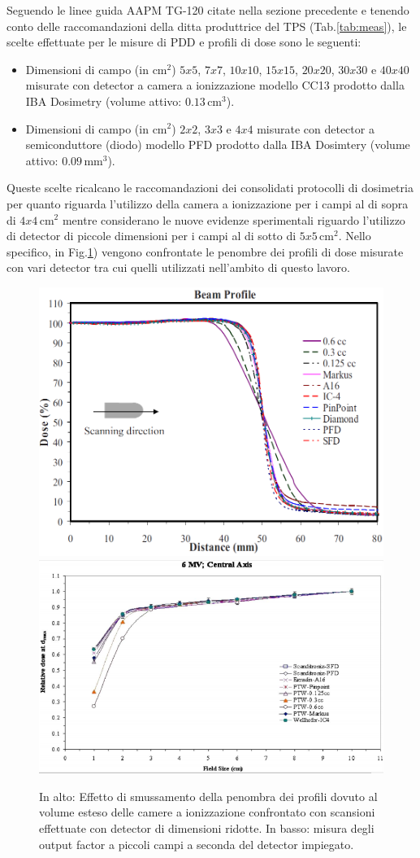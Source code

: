 Seguendo le linee guida AAPM TG-120 citate nella sezione precedente \cite{Low2011} e tenendo conto delle raccomandazioni della ditta produttrice del TPS (Tab.\ref{tab:meas}), le scelte effettuate per le misure di PDD e profili di dose sono le seguenti:
\begin{itemize}
\item Dimensioni di campo (in cm$^2$) $5x5$, $7x7$, $10x10$, $15x15$, $20x20$, $30x30$ e $40x40$ misurate con detector a camera a ionizzazione modello CC13 prodotto dalla IBA Dosimetry (volume attivo: $0.13\,$cm$^3$).
\item Dimensioni di campo (in cm$^2$) $2x2$, $3x3$ e $4x4$ misurate con detector a semiconduttore (diodo) modello PFD prodotto dalla IBA Dosimtery (volume attivo: $0.09\,$mm$^3$).
\end{itemize}
Queste scelte ricalcano le raccomandazioni dei consolidati protocolli di dosimetria per quanto riguarda l'utilizzo della camera a ionizzazione per i campi al di sopra di $4x4\,$cm$^2$ mentre considerano le nuove evidenze sperimentali \cite{Das2008a,Low2011} riguardo l'utilizzo di detector di piccole dimensioni per i campi al di sotto di $5x5\,$cm$^2$. Nello specifico, in Fig.\ref{fig:pen_of}) vengono confrontate le penombre dei profili di dose misurate con vari detector tra cui quelli utilizzati nell'ambito di questo lavoro.
\begin{figure}[!t]
\centering
\includegraphics[width=.7\textwidth]{./cap2/pen_smear.png}\\
\includegraphics[width=.7\textwidth]{./cap2/OF_uncert.png}
\caption{In alto: Effetto di smussamento della penombra dei profili dovuto al volume esteso delle camere a ionizzazione confrontato con scansioni effettuate con detector di dimensioni ridotte\cite{Das2008a}. In basso: misura degli output factor a piccoli campi a seconda del detector impiegato\cite{Das2008}.}
\label{fig:pen_of}
\end{figure}
